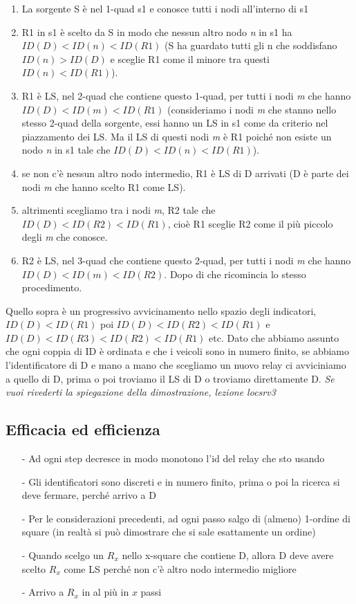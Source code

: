 \documentclass[12pt,italian]{report}
\begin{document}
\begin{enumerate}
    \item La sorgente S è nel 1-quad s1 e conosce tutti i nodi all'interno di s1
    \item R1 in s1 è scelto da S in modo che nessun altro nodo \textit{n} in s1 ha $ID(D) < ID(n) < ID(R1)$ (S ha guardato tutti gli n che soddisfano $ID(n) > ID(D)$ e sceglie R1 come il minore tra questi $ID(n) < ID(R1)$).
    \item R1 è LS, nel 2-quad che contiene questo 1-quad, per tutti i nodi \textit{m} che hanno $ID(D) < ID(m) < ID(R1)$ (consideriamo i nodi \textit{m} che stanno nello stesso 2-quad della sorgente, essi hanno un LS in s1 come da criterio nel piazzamento dei LS. Ma il LS di questi nodi \textit{m} è R1 poiché non esiste un nodo \textit{n} in s1 tale che $ID(D) < ID(n) < ID(R1)$).
    \item se non c'è nessun altro nodo intermedio, R1 è LS di D arrivati (D è parte dei nodi \textit{m} che hanno scelto R1 come LS).
    \item altrimenti scegliamo tra i nodi \textit{m}, R2 tale che $ID(D) < ID(R2) < ID(R1)$, cioè R1 sceglie R2 come il più piccolo degli \textit{m} che conosce. 
    \item R2 è LS, nel 3-quad che contiene questo 2-quad, per tutti i nodi \textit{m} che hanno $ID(D) < ID(m) < ID(R2)$. Dopo di che ricomincia lo stesso procedimento. 
\end{enumerate}
Quello sopra è un progressivo avvicinamento nello spazio degli indicatori, $ID(D) < ID(R1)$ poi $ID(D) < ID(R2) < ID(R1)$ e $ID(D) < ID(R3) < ID(R2) < ID(R1)$ etc. Dato che abbiamo assunto che ogni coppia di ID è ordinata e che i veicoli sono in numero finito, se abbiamo l'identificatore di D e mano a mano che scegliamo un nuovo relay ci avviciniamo a quello di D, prima o poi troviamo il LS di D o troviamo direttamente D.  
\bigbreak
\noindent \textit{Se vuoi rivederti la spiegazione della dimostrazione, lezione locsrv3}

\subsection{Efficacia ed efficienza}
\begin{itemize}
    \item [-] Ad ogni step decresce in modo monotono l'id del relay che sto usando
    \item [-] Gli identificatori sono discreti e in numero finito, prima o poi la ricerca si deve fermare, perché arrivo a D
    \item [-] Per le considerazioni precedenti, ad ogni passo salgo di (almeno) 1-ordine di square (in realtà si può dimostrare che si sale esattamente un ordine)
    \item [-] Quando scelgo un $R_x$ nello x-square che contiene D, allora D deve avere scelto $R_x$ come LS perché non c'è altro nodo intermedio migliore
    \item [-] Arrivo a $R_x$ in al più in $x$ passi
\end{itemize}
\end{document}
